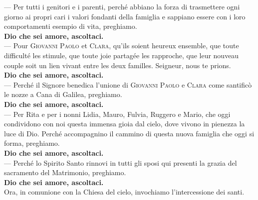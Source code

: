 \documentclass[10pt,b6paper,usenames,twoside]{article}
\begin{document}
\noindent --- Per tutti i genitori e i parenti, perché abbiano la forza di trasmettere ogni giorno ai propri cari i valori fondanti della famiglia e sappiano essere con i loro comportamenti esempio di vita, preghiamo.\\ 
\textbf{Dio che sei amore, ascoltaci.}\\ 

\noindent --- Pour \textcolor{forestgreen(traditional)}{\textsc{Giovanni Paolo}} et \textcolor{forestgreen(traditional)}{\textsc{Clara}}, qu'ils soient heureux ensemble, que toute difficulté les stimule, que toute joie partagée les rapproche, que leur nouveau couple soit un lien vivant entre les deux familles. Seigneur, nous te prions.\\ 
\textbf{Dio che sei amore, ascoltaci.}\\

\noindent --- Perché il Signore benedica l’unione di \textcolor{forestgreen(traditional)}{\textsc{Giovanni Paolo}} e \textcolor{forestgreen(traditional)}{\textsc{Clara}} come santificò le nozze a Cana di Galilea, preghiamo.\\ 
\textbf{Dio che sei amore, ascoltaci.}\\ 

\noindent --- Per Rita e per i nonni Lidia, Mauro, Fulvia, Ruggero e Mario, che oggi condividono con noi questa immensa gioia dal cielo, dove vivono in pienezza la luce di Dio. Perché accompagnino il cammino di questa nuova famiglia che oggi si forma, preghiamo.\\ 
\textbf{Dio che sei amore, ascoltaci.}\\ 

\noindent --- Perché lo Spirito Santo rinnovi in tutti gli sposi qui presenti la grazia del sacramento del Matrimonio, preghiamo.\\ 
\textbf{Dio che sei amore, ascoltaci.}\\ 

\noindent Ora, in comunione con la Chiesa del cielo, invochiamo l'intercessione dei santi.\\ 
\end{document}
